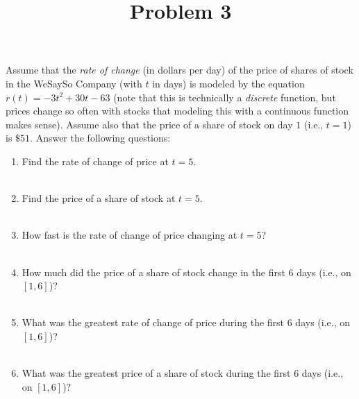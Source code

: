 \documentclass{ximera}
\title[Problem 3]{Problem 3}
\begin{document}
\begin{abstract} \end{abstract}
\maketitle

\begin{problem}
	Assume that the {\it rate of change} (in dollars per day) of the price of shares of stock
	in the WeSaySo Company (with $t$ in days) is modeled by the equation $r(t) = -3t^2+30t-63$
	(note that this is technically a {\it discrete} function, but prices change so often with stocks that modeling this with a continuous function makes sense).
	Assume also that the price of a share of stock on day $1$ (i.e., $t=1$) is $\$51$.
	Answer the following questions:
	\begin{enumerate}

	\item  Find the rate of change of price at $t=5$.\\ \\
		\item  Find the price of a share of stock at $t=5$.\\ \\
		\item  How fast is the rate of change of price changing at $t=5$?\\ \\
		\item  How much did the price of a share of stock change in the first $6$ days (i.e., on $[1,6]$)?\\ \\
		\item  What was the greatest rate of change of price during the first $6$ days (i.e., on $[1,6]$)?\\ \\

	\item  What was the greatest price of a share of stock during the first $6$ days (i.e., on $[1,6]$)?\\ \\
		
	\end{enumerate}
\end{problem}
\end{document}
